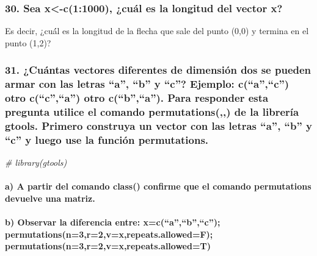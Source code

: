 \documentclass[
]{article}
\newenvironment{Shaded}{\begin{snugshade}}{\end{snugshade}}
\newcommand{\CommentTok}[1]{\textcolor[rgb]{0.56,0.35,0.01}{\textit{#1}}}
\begin{document}
\hypertarget{sea-x-c11000-cuuxe1l-es-la-longitud-del-vector-x}{%
\subsubsection{30. Sea x\textless-c(1:1000), ¿cuál es la longitud del
vector x?}\label{sea-x-c11000-cuuxe1l-es-la-longitud-del-vector-x}}

Es decir, ¿cuá́l es la longitud de la flecha que sale del punto (0,0) y
termina en el punto (1,2)?

\hypertarget{cuuxe1ntas-vectores-diferentes-de-dimensiuxf3n-dos-se-pueden-armar-con-las-letras-a-b-y-c-ejemplo-cac-otro-cca-otro-cba.-para-responder-esta-pregunta-utilice-el-comando-permutations-de-la-libreruxeda-gtools.-primero-construya-un-vector-con-las-letras-a-b-y-c-y-luego-use-la-funciuxf3n-permutations.}{%
\subsubsection{31. ¿Cuántas vectores diferentes de dimensión dos se
pueden armar con las letras ``a'', ``b'' y ``c''? Ejemplo:
c(``a'',``c'') otro c(``c'',``a'') otro c(``b'',``a''). Para responder
esta pregunta utilice el comando permutations(,,) de la librería gtools.
Primero construya un vector con las letras ``a'', ``b'' y ``c'' y luego
use la función
permutations.}\label{cuuxe1ntas-vectores-diferentes-de-dimensiuxf3n-dos-se-pueden-armar-con-las-letras-a-b-y-c-ejemplo-cac-otro-cca-otro-cba.-para-responder-esta-pregunta-utilice-el-comando-permutations-de-la-libreruxeda-gtools.-primero-construya-un-vector-con-las-letras-a-b-y-c-y-luego-use-la-funciuxf3n-permutations.}}

\begin{Shaded}
\begin{Highlighting}[]
\CommentTok{\# library(gtools)}
\end{Highlighting}
\end{Shaded}

\hypertarget{a-a-partir-del-comando-class-confirme-que-el-comando-permutations-devuelve-una-matriz.}{%
\paragraph{a) A partir del comando class() confirme que el comando
permutations devuelve una
matriz.}\label{a-a-partir-del-comando-class-confirme-que-el-comando-permutations-devuelve-una-matriz.}}

\hypertarget{b-observar-la-diferencia-entre-xcabc-permutationsn3r2vxrepeats.allowedf-permutationsn3r2vxrepeats.allowedt}{%
\paragraph{b) Observar la diferencia entre: x=c(``a'',``b'',``c'');
permutations(n=3,r=2,v=x,repeats.allowed=F);
permutations(n=3,r=2,v=x,repeats.allowed=T)}\label{b-observar-la-diferencia-entre-xcabc-permutationsn3r2vxrepeats.allowedf-permutationsn3r2vxrepeats.allowedt}}
\end{document}
